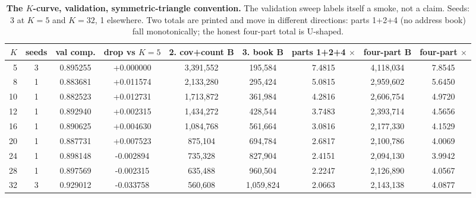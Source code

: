 \documentclass{article} %
\begin{document}
\begin{table}[h]
\centering\small
\caption{\textbf{The $K$-curve, validation, symmetric-triangle convention.} The validation sweep
labels itself a smoke, not a claim. Seeds: 3 at $K=5$ and $K=32$, 1 elsewhere. Two totals are %
printed and move in different directions: parts 1+2+4 (no address book) fall monotonically; the
honest four-part total is U-shaped.}
\label{tab:kcurve}
\setlength{\tabcolsep}{2.4pt}
\begin{adjustbox}{max width=\linewidth}\begin{tabular}{rcccccccc}
\toprule
$K$ & seeds & val comp. & drop vs $K{=}5$ & 2. cov+count B & 3. book B & parts 1+2+4 $\times$ & four-part B & four-part $\times$ \\
\midrule
5 & 3 & 0.895255 & +0.000000 & 3,391,552 & 195,584 & 7.4815 & 4,118,034 & 7.8545 \\
8 & 1 & 0.883681 & +0.011574 & 2,133,280 & 295,424 & 5.0815 & 2,959,602 & 5.6450 \\
10 & 1 & 0.882523 & +0.012731 & 1,713,872 & 361,984 & 4.2816 & 2,606,754 & 4.9720 \\
12 & 1 & 0.892940 & +0.002315 & 1,434,272 & 428,544 & 3.7483 & 2,393,714 & 4.5656 \\
16 & 1 & 0.890625 & +0.004630 & 1,084,768 & 561,664 & 3.0816 & 2,177,330 & 4.1529 \\
20 & 1 & 0.887731 & +0.007523 & 875,104 & 694,784 & 2.6817 & 2,100,786 & 4.0069 \\
24 & 1 & 0.898148 & -0.002894 & 735,328 & 827,904 & 2.4151 & 2,094,130 & 3.9942 \\
28 & 1 & 0.897569 & -0.002315 & 635,488 & 960,504 & 2.2247 & 2,126,890 & 4.0567 \\
32 & 3 & 0.929012 & -0.033758 & 560,608 & 1,059,824 & 2.0663 & 2,143,138 & 4.0877 \\
\bottomrule
\end{tabular}\end{adjustbox}
\end{table}
\end{document}
